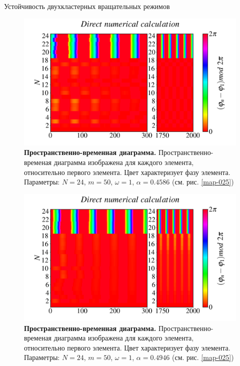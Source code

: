 \begin{chapter}{Устойчивость двухкластерных вращательных режимов}
	\begin{figure}[h!]\center
		\includegraphics[width=1\columnwidth]{pictures/Figure_M_50_A_0.4586_O_1.png}
		\caption{\textbf{Пространственно-временная диаграмма.}
		Пространственно-временая диаграмма изображена для каждого элемента, относительно первого элемента.
		Цвет характеризует фазу элемента. Параметры: $N=24$, $m = 50$, $\omega = 1$, $\alpha = 0.4586$ (см. рис. \ref{map-025})}
		\label{st-c-1}
	\end{figure}

	\begin{figure}[h!]\center
		\includegraphics[width=1\columnwidth]{pictures/Figure_M_50_A_0.4946_O_1.png}
		\caption{\textbf{Пространственно-временная диаграмма.}
		Пространственно-временая диаграмма изображена для каждого элемента, относительно первого элемента.
		Цвет характеризует фазу элемента. Параметры: $N=24$, $m = 50$, $\omega = 1$, $\alpha = 0.4946$ (см. рис. \ref{map-025})}
		\label{st-c-2}
	\end{figure}


\end{chapter}
